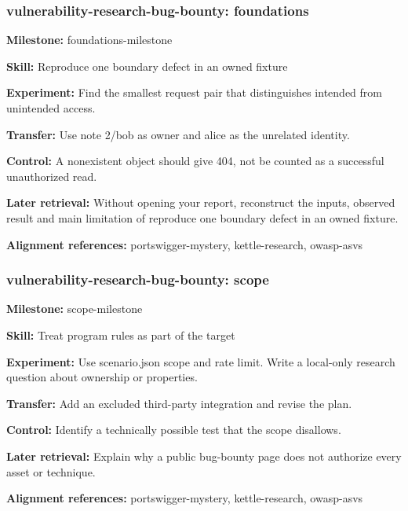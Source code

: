 \subsubsection{vulnerability-research-bug-bounty: foundations}
\noindent\textbf{Milestone:} foundations-milestone\par
\noindent\textbf{Skill:} Reproduce one boundary defect in an owned fixture\par
\noindent\textbf{Experiment:} Find the smallest request pair that distinguishes intended from unintended access.\par
\noindent\textbf{Transfer:} Use note 2/bob as owner and alice as the unrelated identity.\par
\noindent\textbf{Control:} A nonexistent object should give 404, not be counted as a successful unauthorized read.\par
\noindent\textbf{Later retrieval:} Without opening your report, reconstruct the inputs, observed result and main limitation of reproduce one boundary defect in an owned fixture.\par
\noindent\textbf{Alignment references:} portswigger-mystery, kettle-research, owasp-asvs\par
\subsubsection{vulnerability-research-bug-bounty: scope}
\noindent\textbf{Milestone:} scope-milestone\par
\noindent\textbf{Skill:} Treat program rules as part of the target\par
\noindent\textbf{Experiment:} Use scenario.json scope and rate limit. Write a local-only research question about  ownership or  properties.\par
\noindent\textbf{Transfer:} Add an excluded third-party integration and revise the plan.\par
\noindent\textbf{Control:} Identify a technically possible test that the scope disallows.\par
\noindent\textbf{Later retrieval:} Explain why a public bug-bounty page does not authorize every asset or technique.\par
\noindent\textbf{Alignment references:} portswigger-mystery, kettle-research, owasp-asvs\par

